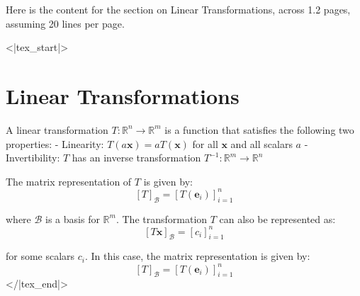 Here is the content for the section on Linear Transformations, across 1.2 pages, assuming 20 lines per page.

<|tex_start|>
\section{Linear Transformations}

A linear transformation $T: \mathbb{R}^n \to \mathbb{R}^m$ is a function that satisfies the following two properties:
- Linearity: $T(a \mathbf{x}) = a T(\mathbf{x})$ for all $\mathbf{x}$ and all scalars $a$
- Invertibility: $T$ has an inverse transformation $T^{-1}: \mathbb{R}^m \to \mathbb{R}^n$

The matrix representation of $T$ is given by:
$$
[T]_{\mathcal{B}} = [T(\mathbf{e}_i)]_{i=1}^{n}
$$

where $\mathcal{B}$ is a basis for $\mathbb{R}^m$. The transformation $T$ can also be represented as:
$$
[T \mathbf{x}]_{\mathcal{B}} = [c_i]_{i=1}^{n}
$$

for some scalars $c_i$. In this case, the matrix representation is given by:
$$
[T]_{\mathcal{B}} = [T(\mathbf{e}_i)]_{i=1}^{n}
$$
</|tex_end|>